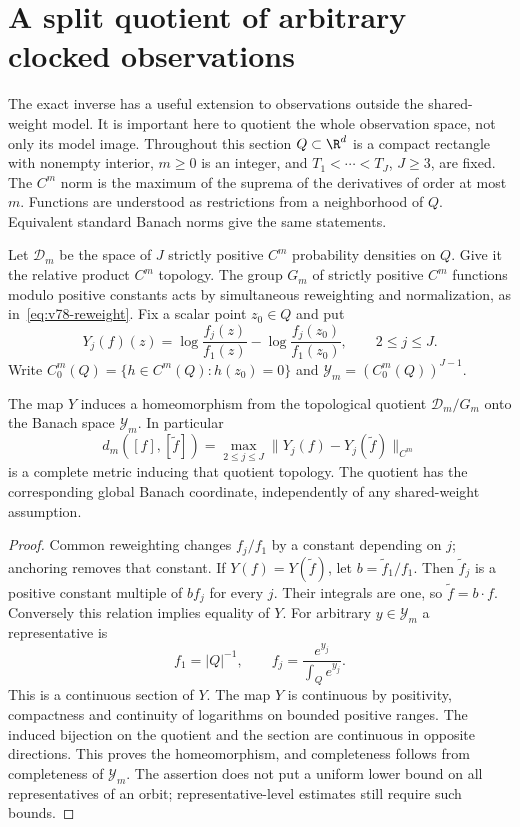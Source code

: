 \section{A split quotient of arbitrary clocked observations}
\label{sec:v79-quotient}

The exact inverse has a useful extension to observations outside the
shared-weight model.  It is important here to quotient the whole
observation space, not only its model image.  Throughout this section
$Q\subset\R^d$ is a compact rectangle with nonempty interior,
$m\ge0$ is an integer, and $T_1<\cdots<T_J$, $J\ge3$, are fixed.
The $C^m$ norm is the maximum of the suprema of the derivatives of
order at most $m$.  Functions are understood as restrictions from a
neighborhood of $Q$.  Equivalent standard Banach norms give the same
statements.

Let $\mathcal D_m$ be the space of $J$ strictly positive $C^m$
probability densities on $Q$.  Give it the relative product $C^m$
topology.  The group $G_m$ of strictly positive $C^m$ functions modulo
positive constants acts by simultaneous reweighting and normalization,
as in~\eqref{eq:v78-reweight}.  Fix a scalar point $z_0\in Q$ and put
\begin{equation}\label{eq:v79-log-contrast}
 Y_j(f)(z)=\log\frac{f_j(z)}{f_1(z)}
             -\log\frac{f_j(z_0)}{f_1(z_0)},\qquad 2\le j\le J.
\end{equation}
Write $C^m_0(Q)=\{h\in C^m(Q):h(z_0)=0\}$ and
$\mathcal Y_m=(C^m_0(Q))^{J-1}$.

\begin{proposition}
\label{prop:v79-ambient}
The map $Y$ induces a homeomorphism from the topological quotient
$\mathcal D_m/G_m$ onto the Banach space $\mathcal Y_m$.  In particular
\begin{equation}\label{eq:v79-quotient-metric}
 d_m([f],[\widetilde f])
       =\max_{2\le j\le J}\|Y_j(f)-Y_j(\widetilde f)\|_{C^m}
\end{equation}
is a complete metric inducing that quotient topology.  The quotient
has the corresponding global Banach coordinate, independently of any
shared-weight assumption.
\end{proposition}
\begin{proof}
Common reweighting changes $f_j/f_1$ by a constant depending on $j$;
anchoring removes that constant.  If $Y(f)=Y(\widetilde f)$, let
$b=\widetilde f_1/f_1$.  Then $\widetilde f_j$ is a positive constant
multiple of $bf_j$ for every $j$.  Their integrals are one, so
$\widetilde f=b\cdot f$.  Conversely this relation implies equality
of $Y$.  For arbitrary $y\in\mathcal Y_m$ a representative is
\[
 f_1=|Q|^{-1},\qquad f_j=\frac{e^{y_j}}{\int_Qe^{y_j}}.
\]
This is a continuous section of $Y$.  The map $Y$ is continuous by
positivity, compactness and continuity of logarithms on bounded
positive ranges.  The induced bijection on the quotient and the section
are continuous in opposite directions.  This proves the homeomorphism,
and completeness follows from completeness of $\mathcal Y_m$.
The assertion does not put a uniform lower bound on all representatives
of an orbit; representative-level estimates still require such bounds.
\end{proof}

